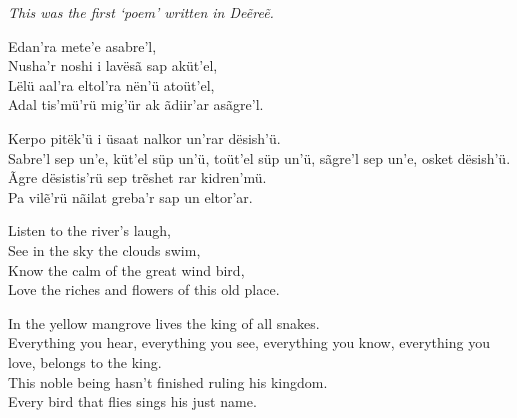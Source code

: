 \label{samp:theKingOfAllSnakes}
\emph{This was the first ‘poem’ written in Deẽreẽ.}

Edan’ra mete’e asabre’l,\\
Nusha’r noshi i lavësã sap aküt’el,\\
Lëlü aal’ra eltol’ra nën’ü atoüt’el,\\
Adal tis’mü’rü mig’ür ak ãdiir’ar asãgre’l.

Kerpo pitëk’ü i üsaat nalkor un’rar dësish’ü.\\
Sabre’l sep un’e, küt’el süp un’ü, toüt’el süp un’ü, sãgre’l sep un’e, osket dësish’ü.\\
Ãgre dësistis’rü sep trẽshet rar kidren’mü.\\
Pa vilẽ’rü nãilat greba’r sap un eltor’ar.

Listen to the river’s laugh,\\
See in the sky the clouds swim,\\
Know the calm of the great wind bird,\\
Love the riches and flowers of this old place.

In the yellow mangrove lives the king of all snakes.\\
Everything you hear, everything you see, everything you know, everything you love, belongs to the king.\\
This noble being hasn’t finished ruling his kingdom.\\
Every bird that flies sings his just name.

